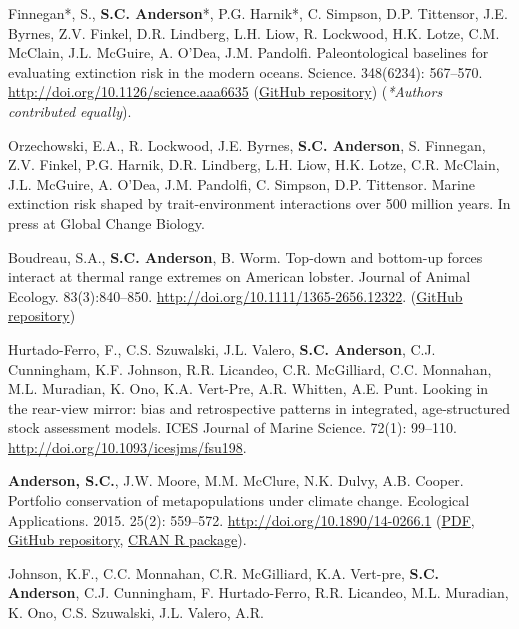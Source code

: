 \begin{description}
\itemsep3pt\parskip0pt
\item[2015]
Finnegan*, S., \textbf{S.C. Anderson}*, P.G. Harnik*, C. Simpson, D.P.
Tittensor, J.E. Byrnes, Z.V. Finkel, D.R. Lindberg, L.H. Liow, R.
Lockwood, H.K. Lotze, C.M. McClain, J.L. McGuire, A. O'Dea, J.M.
Pandolfi. Paleontological baselines for evaluating extinction risk in
the modern oceans. Science. 348(6234): 567--570.
\url{http://doi.org/10.1126/science.aaa6635}
(\href{https://github.com/seananderson/paleobaselines}{GitHub
repository}) (\emph{*Authors contributed equally}).
\item[2015]
Orzechowski, E.A., R. Lockwood, J.E. Byrnes, \textbf{S.C. Anderson}, S.
Finnegan, Z.V. Finkel, P.G. Harnik, D.R. Lindberg, L.H. Liow, H.K.
Lotze, C.R. McClain, J.L. McGuire, A. O'Dea, J.M. Pandolfi, C. Simpson,
D.P. Tittensor. Marine extinction risk shaped by trait-environment
interactions over 500 million years. In press at Global Change Biology.
\item[2015]
Boudreau, S.A., \textbf{S.C. Anderson}, B. Worm. Top-down and bottom-up
forces interact at thermal range extremes on American lobster. Journal
of Animal Ecology. 83(3):840--850.
\url{http://doi.org/10.1111/1365-2656.12322}.
(\href{https://github.com/seananderson/lobsters-predators}{GitHub
repository})
\item[2015]
Hurtado-Ferro, F., C.S. Szuwalski, J.L. Valero, \textbf{S.C. Anderson},
C.J. Cunningham, K.F. Johnson, R.R. Licandeo, C.R. McGilliard, C.C.
Monnahan, M.L. Muradian, K. Ono, K.A. Vert-Pre, A.R. Whitten, A.E. Punt.
Looking in the rear-view mirror: bias and retrospective patterns in
integrated, age-structured stock assessment models. ICES Journal of
Marine Science. 72(1): 99--110.
\url{http://doi.org/10.1093/icesjms/fsu198}.
\item[2015]
\textbf{Anderson, S.C.}, J.W. Moore, M.M. McClure, N.K. Dulvy, A.B.
Cooper. Portfolio conservation of metapopulations under climate change.
Ecological Applications. 2015. 25(2): 559--572.
\url{http://doi.org/10.1890/14-0266.1}
(\href{https://dl.dropboxusercontent.com/u/254940/papers/Anderson_etal_2014_salmon_portfolios.pdf}{PDF},
\href{https://github.com/seananderson/metafolio}{GitHub repository},
\href{http://cran.r-project.org/web/packages/metafolio/index.html}{CRAN
R package}).
\item[2015]
Johnson, K.F., C.C. Monnahan, C.R. McGilliard, K.A. Vert-pre,
\textbf{S.C. Anderson}, C.J. Cunningham, F. Hurtado-Ferro, R.R.
Licandeo, M.L. Muradian, K. Ono, C.S. Szuwalski, J.L. Valero, A.R.

\end{description}
